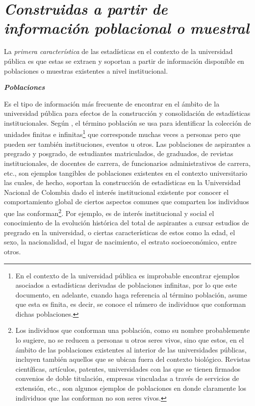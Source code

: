 \documentclass[
]{book}
\begin{document}
\hypertarget{construidas-a-partir-de-informaciuxf3n-poblacional-o-muestral}{%
\chapter{\texorpdfstring{\textbf{\emph{Construidas a partir de información poblacional o muestral}}}{Construidas a partir de información poblacional o muestral}}\label{construidas-a-partir-de-informaciuxf3n-poblacional-o-muestral}}

La \emph{primera característica} de las estadísticas en el contexto de la universidad pública es que estas se extraen y soportan a partir de información disponible en poblaciones o muestras existentes a nivel institucional.

\textbf{\emph{Poblaciones}}

Es el tipo de información más frecuente de encontrar en el ámbito de la universidad pública para efectos de la construcción y consolidación de estadísticas institucionales. Según \citet{everitt2006cambridge}, el término población se usa para identificar la colección de unidades finitas e infinitas\footnote{En el contexto de la universidad pública es improbable encontrar ejemplos asociados a estadísticas derivadas de poblaciones infinitas, por lo que este documento, en adelante, cuando haga referencia al término población, asume que esta es finita, es decir, se conoce el número de individuos que conforman dichas poblaciones.} que corresponde muchas veces a personas pero que pueden ser también instituciones, eventos u otros. Las poblaciones de aspirantes a pregrado y posgrado, de estudiantes matriculados, de graduados, de revistas institucionales, de docentes de carrera, de funcionarios administrativos de carrera, etc., son ejemplos tangibles de poblaciones existentes en el contexto universitario las cuales, de hecho, soportan la construcción de estadísticas en la Universidad Nacional de Colombia dado el interés institucional existente por conocer el comportamiento global de ciertos aspectos comunes que comparten los individuos que las conforman\footnote{Los individuos que conforman una población, como su nombre probablemente lo sugiere, no se reducen a personas u otros seres vivos, sino que estos, en el ámbito de las poblaciones existentes al interior de las universidades públicas, incluyen también aquellos que se ubican fuera del contexto biológico. Revistas científicas, artículos, patentes, universidades con las que se tienen firmados convenios de doble titulación, empresas vinculadas a través de servicios de extensión, etc., son algunos ejemplos de poblaciones en donde claramente los individuos que las conforman no son seres vivos.}. Por ejemplo, es de interés institucional y social el conocimiento de la evolución histórica del total de aspirantes a cursar estudios de pregrado en la universidad, o ciertas características de estos como la edad, el sexo, la nacionalidad, el lugar de nacimiento, el estrato socioeconómico, entre otros.
\end{document}
